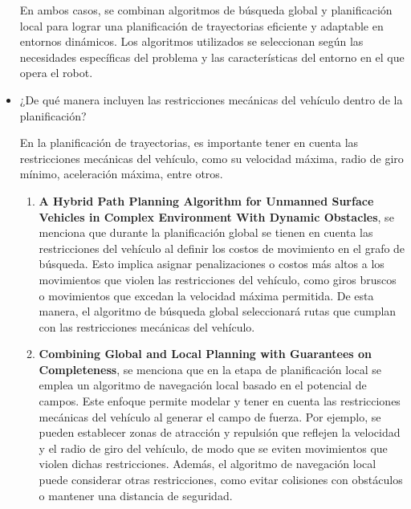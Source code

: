 \documentclass{article}
\begin{document}
\begin{itemize}
\begin{enumerate}
  \end{enumerate}

  En ambos casos, se combinan algoritmos de búsqueda global y planificación local para lograr una planificación de trayectorias eficiente y adaptable en entornos dinámicos. Los algoritmos utilizados se seleccionan según las necesidades específicas del problema y las características del entorno en el que opera el robot.
  
\item ¿De qué manera incluyen las restricciones mecánicas del vehículo dentro de la planificación?

  En la planificación de trayectorias, es importante tener en cuenta las restricciones mecánicas del vehículo, como su velocidad máxima, radio de giro mínimo, aceleración máxima, entre otros.

  \begin{enumerate}
  \item \textbf{A Hybrid Path Planning Algorithm for Unmanned Surface Vehicles in Complex Environment With Dynamic Obstacles}, se menciona que durante la planificación global se tienen en cuenta las restricciones del vehículo al definir los costos de movimiento en el grafo de búsqueda. Esto implica asignar penalizaciones o costos más altos a los movimientos que violen las restricciones del vehículo, como giros bruscos o movimientos que excedan la velocidad máxima permitida. De esta manera, el algoritmo de búsqueda global seleccionará rutas que cumplan con las restricciones mecánicas del vehículo.

  \item \textbf{Combining Global and Local Planning with Guarantees on Completeness}, se menciona que en la etapa de planificación local se emplea un algoritmo de navegación local basado en el potencial de campos. Este enfoque permite modelar y tener en cuenta las restricciones mecánicas del vehículo al generar el campo de fuerza. Por ejemplo, se pueden establecer zonas de atracción y repulsión que reflejen la velocidad y el radio de giro del vehículo, de modo que se eviten movimientos que violen dichas restricciones. Además, el algoritmo de navegación local puede considerar otras restricciones, como evitar colisiones con obstáculos o mantener una distancia de seguridad.
    
  \end{enumerate}
  
\end{itemize}
\end{document}

